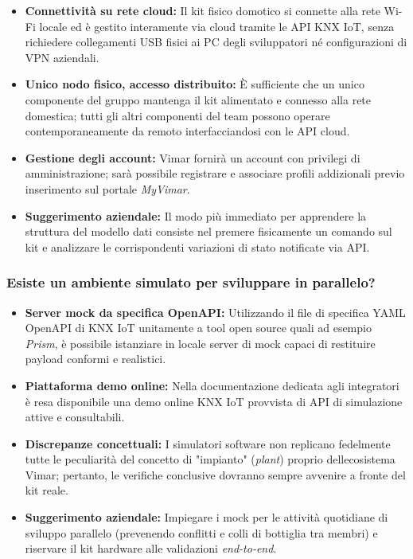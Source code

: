 \documentclass[12pt,a4paper]{article}
\newcommand{\tightlist}{\setlength{\itemsep}{1pt}\setlength{\parskip}{0pt}}
\begin{document}
\begin{itemize}
\tightlist
\item \textbf{Connettività su rete cloud:} Il kit fisico domotico si connette alla rete Wi-Fi locale ed è gestito interamente via cloud tramite le API KNX IoT, senza richiedere collegamenti USB fisici ai PC degli sviluppatori né configurazioni di VPN aziendali.
\item \textbf{Unico nodo fisico, accesso distribuito:} È sufficiente che un unico componente del gruppo mantenga il kit alimentato e connesso alla rete domestica; tutti gli altri componenti del team possono operare contemporaneamente da remoto interfacciandosi con le API cloud.
\item \textbf{Gestione degli account:} Vimar fornirà un account con privilegi di amministrazione; sarà possibile registrare e associare profili addizionali previo inserimento sul portale \emph{MyVimar}.
\item \textbf{Suggerimento aziendale:} Il modo più immediato per apprendere la struttura del modello dati consiste nel premere fisicamente un comando sul kit e analizzare le corrispondenti variazioni di stato notificate via API.
\end{itemize}

\hypertarget{esiste-un-ambiente-simulato-per-sviluppare-in-parallelo}{%
\subsubsection{\texorpdfstring{Esiste un ambiente simulato per sviluppare in parallelo?}{Esiste un ambiente simulato per sviluppare in parallelo?}}}

\begin{itemize}
\tightlist
\item \textbf{Server mock da specifica OpenAPI:} Utilizzando il file di specifica YAML OpenAPI di KNX IoT unitamente a tool open source quali ad esempio \emph{Prism}, è possibile istanziare in locale server di mock capaci di restituire payload conformi e realistici.
\item \textbf{Piattaforma demo online:} Nella documentazione dedicata agli integratori è resa disponibile una demo online KNX IoT provvista di API di simulazione attive e consultabili.
\item \textbf{Discrepanze concettuali:} I simulatori software non replicano fedelmente tutte le peculiarità del concetto di "impianto" (\emph{plant}) proprio dell\textquotesingle ecosistema Vimar; pertanto, le verifiche conclusive dovranno sempre avvenire a fronte del kit reale.
\item \textbf{Suggerimento aziendale:} Impiegare i mock per le attività quotidiane di sviluppo parallelo (prevenendo conflitti e colli di bottiglia tra membri) e riservare il kit hardware alle validazioni \emph{end-to-end}.
\end{itemize}
\end{document}

